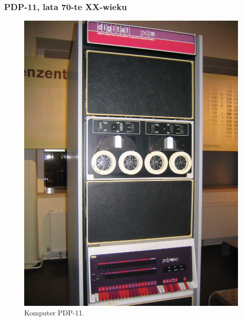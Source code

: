 \documentclass[10pt,t]{beamer}
\begin{document}
\begin{frame}
  \frametitle{PDP-11, lata 70-te XX-wieku}


  \begin{figure}

    \centering


    \includegraphics[scale=0.225]
    {./PresentationsPictures/Machines-Pictures/PDP-11.jpeg}

    \caption{Komputer PDP-11.}

    \label{fig:PDP-11}

  \end{figure}

\end{frame}
\end{document}
